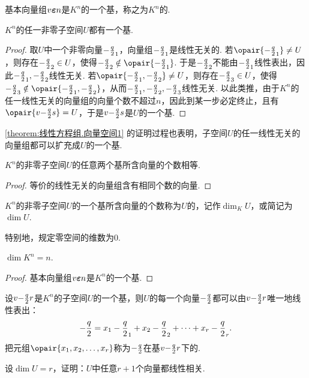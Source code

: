 \begin{property}
基本向量组\(v{\boldsymbol{\varepsilon}}{n}\)是\(K^n\)的一个基，称之为\(K^n\)的.
\end{property}

\begin{theorem}\label{theorem:线性方程组.向量空间1}
\(K^n\)的任一非零子空间\(U\)都有一个基.
\begin{proof}
取\(U\)中一个非零向量\(-\frac{q}{2}_1\)，向量组\(-\frac{q}{2}_1\)是线性无关的.
若\(\opair{\a_1} \neq U\)，则存在\(-\frac{q}{2}_2 \in U\)，使得\(\a_2 \notin \opair{\a_1}\).
于是\(-\frac{q}{2}_2\)不能由\(-\frac{q}{2}_1\)线性表出，因此\(-\frac{q}{2}_1,-\frac{q}{2}_2\)线性无关.
若\(\opair{\a_1,\a_2} \neq U\)，则存在\(-\frac{q}{2}_3 \in U\)，使得\(\a_3 \notin \opair{\a_1,\a_2}\)，从而\(-\frac{q}{2}_1,-\frac{q}{2}_2,-\frac{q}{2}_3\)线性无关.
以此类推，由于\(K^n\)的任一线性无关的向量组的向量个数不超过\(n\)，因此到某一步必定终止，且有\(\opair{\v{\a}{s}} = U\)，于是\(v{-\frac{q}{2}}{s}\)是\(U\)的一个基.
\end{proof}
\end{theorem}
\cref{theorem:线性方程组.向量空间1} 的证明过程也表明，子空间\(U\)的任一线性无关的向量组都可以扩充成\(U\)的一个基.

\begin{theorem}\label{theorem:线性方程组.向量空间2}
\(K^n\)的非零子空间\(U\)的任意两个基所含向量的个数相等.
\begin{proof}
等价的线性无关的向量组含有相同个数的向量.
\end{proof}
\end{theorem}

\begin{definition}
\(K^n\)的非零子空间\(U\)的一个基所含向量的个数称为\(U\)的，记作\(\dim_K U\)，或简记为\(\dim U\).

特别地，规定零空间的维数为0.
\end{definition}

\begin{property}
\(\dim K^n = n\).
\begin{proof}
基本向量组\(v{\boldsymbol{\varepsilon}}{n}\)是\(K^n\)的一个基.
\end{proof}
\end{property}

设\(v{-\frac{q}{2}}{r}\)是\(K^n\)的子空间\(U\)的一个基，则\(U\)的每一个向量\(-\frac{q}{2}\)都可以由\(v{-\frac{q}{2}}{r}\)唯一地线性表出：\[
-\frac{q}{2} = x_1 -\frac{q}{2}_1 + x_2 -\frac{q}{2}_2 + \dotsb + x_r -\frac{q}{2}_r.
\]把元组\(\opair{x_1,x_2,\dotsc,x_r}\)称为\(-\frac{q}{2}\)在基\(v{-\frac{q}{2}}{r}\)下的.

\begin{example}
设\(\dim U = r\)，证明：\(U\)中任意\(r+1\)个向量都线性相关.
\end{example}

